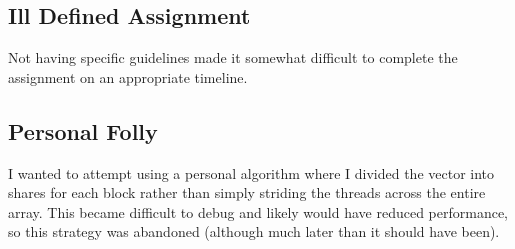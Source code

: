 \documentclass{article}
\begin{document}
\subsection{Ill Defined Assignment}
Not having specific guidelines made it somewhat difficult to complete the assignment on an appropriate timeline.

\subsection{Personal Folly}
I wanted to attempt using a personal algorithm where I divided the vector into shares for each block rather than simply striding the threads across the entire array. This became difficult to debug and likely would have reduced performance, so this strategy was abandoned (although much later than it should have been).
  
\end{document}
